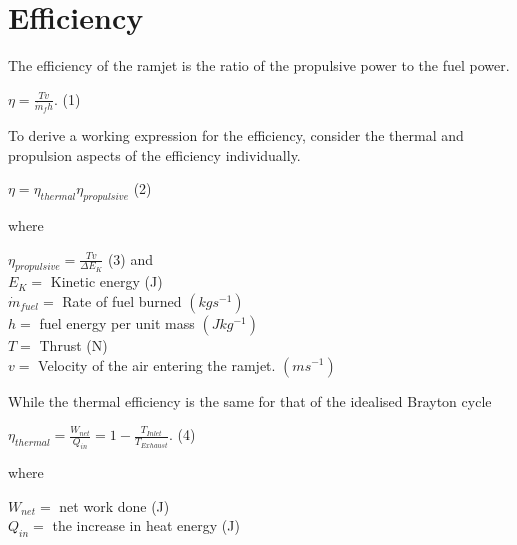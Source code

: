 \documentclass[12pt,onecolumn]{IEEEtran}
\begin{document}
\section{Efficiency}
\begin{flushleft}
The efficiency of the ramjet is the ratio of the propulsive power to the fuel power.\cite{greitzer_spakovsky_waitz}\\
\begin{center}
$ \eta = \frac{Tv}{\dot{m}_f h}.$ (1)
\end{center}
To derive a working expression for the efficiency, consider the thermal and propulsion aspects of the efficiency individually.\\
\begin{center}
$ \eta = \eta_{thermal} \eta_{propulsive}$ (2)
\end{center}
where\\
\begin{center}
$\eta_{propulsive}=\frac{Tv}{\Delta E_K} $ (3)
\vspace{1mm}
and\\
\vspace{2mm}
$
E_K = $ Kinetic energy (J)\\
\vspace{1mm}
$\dot{m}_{fuel} = $ Rate of fuel burned $(kgs^{-1})$\\
\vspace{1mm}
$h = $ fuel energy per unit mass $(Jkg^{-1})$\\
\vspace{1mm}
$T = $ Thrust (N)\\
\vspace{1mm}
$v = $ Velocity of the air entering the ramjet. $(ms^{-1})$\\
\end{center}
While the thermal efficiency is the same for that of the idealised Brayton cycle\\
\vspace{1mm}
\begin{center}
$\eta_{thermal}=\frac{W_{net}}{Q_{in}}=1-\frac{T_{Inlet}}{T_{Exhaust}}$. (4)\\
\vspace{2mm}
\end{center}
where\\
\begin{center}
$W_{net} = $ net work done (J)\\
\vspace{1mm}
$Q_{in} = $ the increase in heat energy (J)\\

\end{center}
\end{flushleft}
\end{document}
